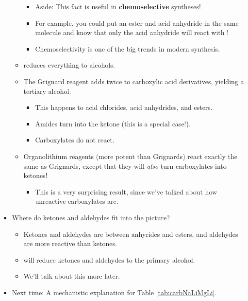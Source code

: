 \documentclass[../notes.tex]{subfiles}
\begin{document}
\begin{itemize}
\begin{itemize}
        \begin{itemize}
            \item Aside: This fact is useful in \textbf{chemoselective} syntheses!
            \item For example, you could put an ester and acid anhydride in the same molecule and know that only the acid anhydride will react with !
            \item Chemoselectivity is one of the big trends in modern synthesis.
        \end{itemize}
        \item {} reduces everything to alcohols.
        \pagebreak
        \item The Grignard reagent adds twice to carboxylic acid derivatives, yielding a tertiary alcohol.
        \begin{itemize}
            \item This happens to acid chlorides, acid anhydrides, and esters.
            \item Amides turn into the ketone (this is a special case!).
            \item Carboxylates do not react.
        \end{itemize}
        \item Organolithium reagents (more potent than Grignards) react exactly the same as Grignards, except that they will \emph{also} turn carboxylates into ketones!
        \begin{itemize}
            \item This is a very surprising result, since we've talked about how unreactive carboxylates are.
        \end{itemize}
    \end{itemize}
    \item Where do ketones and aldehydes fit into the picture?
    \begin{itemize}
        \item Ketones and aldehydes are between anhyrides and esters, and aldehydes are more reactive than ketones.
        \item {} will reduce ketones and aldehydes to the primary alcohol.
        \item We'll talk about this more later.
    \end{itemize}
    \item Next time: A mechanistic explanation for Table \ref{tab:carbNaLiMgLi}.
\end{itemize}
\end{document}
